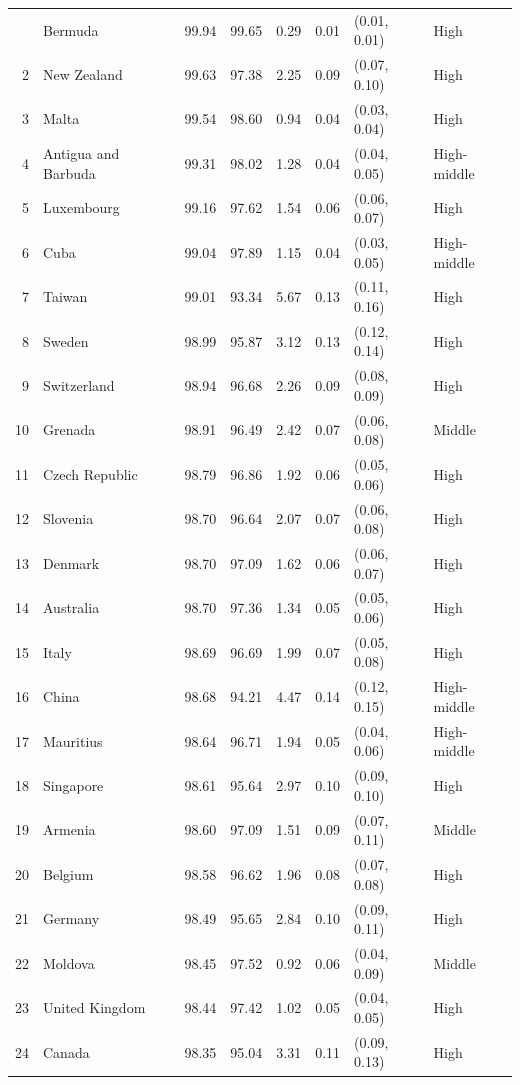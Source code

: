 \begin{longtable}{r l r r r r l l}
\bottomrule
\endlastfoot
1 & Bermuda & 99.94 & 99.65 & 0.29 & 0.01 & (0.01, 0.01) & High \\
2 & New Zealand & 99.63 & 97.38 & 2.25 & 0.09 & (0.07, 0.10) & High \\
3 & Malta & 99.54 & 98.60 & 0.94 & 0.04 & (0.03, 0.04) & High \\
4 & Antigua and Barbuda & 99.31 & 98.02 & 1.28 & 0.04 & (0.04, 0.05) & High-middle \\
5 & Luxembourg & 99.16 & 97.62 & 1.54 & 0.06 & (0.06, 0.07) & High \\
6 & Cuba & 99.04 & 97.89 & 1.15 & 0.04 & (0.03, 0.05) & High-middle \\
7 & Taiwan & 99.01 & 93.34 & 5.67 & 0.13 & (0.11, 0.16) & High \\
8 & Sweden & 98.99 & 95.87 & 3.12 & 0.13 & (0.12, 0.14) & High \\
9 & Switzerland & 98.94 & 96.68 & 2.26 & 0.09 & (0.08, 0.09) & High \\
10 & Grenada & 98.91 & 96.49 & 2.42 & 0.07 & (0.06, 0.08) & Middle \\
11 & Czech Republic & 98.79 & 96.86 & 1.92 & 0.06 & (0.05, 0.06) & High \\
12 & Slovenia & 98.70 & 96.64 & 2.07 & 0.07 & (0.06, 0.08) & High \\
13 & Denmark & 98.70 & 97.09 & 1.62 & 0.06 & (0.06, 0.07) & High \\
14 & Australia & 98.70 & 97.36 & 1.34 & 0.05 & (0.05, 0.06) & High \\
15 & Italy & 98.69 & 96.69 & 1.99 & 0.07 & (0.05, 0.08) & High \\
16 & China & 98.68 & 94.21 & 4.47 & 0.14 & (0.12, 0.15) & High-middle \\
17 & Mauritius & 98.64 & 96.71 & 1.94 & 0.05 & (0.04, 0.06) & High-middle \\
18 & Singapore & 98.61 & 95.64 & 2.97 & 0.10 & (0.09, 0.10) & High \\
19 & Armenia & 98.60 & 97.09 & 1.51 & 0.09 & (0.07, 0.11) & Middle \\
20 & Belgium & 98.58 & 96.62 & 1.96 & 0.08 & (0.07, 0.08) & High \\
21 & Germany & 98.49 & 95.65 & 2.84 & 0.10 & (0.09, 0.11) & High \\
22 & Moldova & 98.45 & 97.52 & 0.92 & 0.06 & (0.04, 0.09) & Middle \\
23 & United Kingdom & 98.44 & 97.42 & 1.02 & 0.05 & (0.04, 0.05) & High \\
24 & Canada & 98.35 & 95.04 & 3.31 & 0.11 & (0.09, 0.13) & High \\

\end{longtable}
